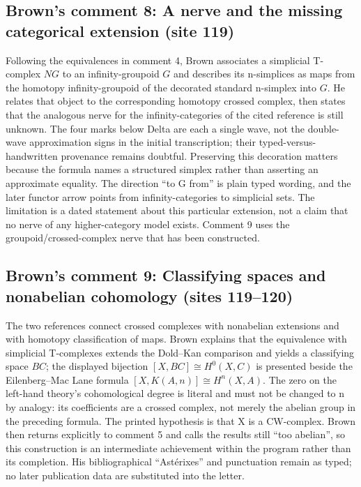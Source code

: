 \documentclass[10pt,oneside]{book}
\begin{document}
\subsection*{Brown's comment 8: A nerve and the missing categorical extension (site 119)}
Following the equivalences in comment 4, Brown associates a simplicial T-complex $NG$ to an infinity-groupoid $G$ and describes its n-simplices as maps from the homotopy infinity-groupoid of the decorated standard n-simplex into $G$. He relates that object to the corresponding homotopy crossed complex, then states that the analogous nerve for the infinity-categories of the cited reference is still unknown. The four marks below Delta are each a single wave, not the double-wave approximation signs in the initial transcription; their typed-versus-handwritten provenance remains doubtful. Preserving this decoration matters because the formula names a structured simplex rather than asserting an approximate equality. The direction ``to G from'' is plain typed wording, and the later functor arrow points from infinity-categories to simplicial sets. The limitation is a dated statement about this particular extension, not a claim that no nerve of any higher-category model exists. Comment 9 uses the groupoid/crossed-complex nerve that has been constructed.

\subsection*{Brown's comment 9: Classifying spaces and nonabelian cohomology (sites 119--120)}
The two references connect crossed complexes with nonabelian extensions and with homotopy classification of maps. Brown explains that the equivalence with simplicial T-complexes extends the Dold--Kan comparison and yields a classifying space $BC$; the displayed bijection $[X,BC]\cong H^0(X,C)$ is presented beside the Eilenberg--Mac Lane formula $[X,K(A,n)]\cong H^n(X,A)$. The zero on the left-hand theory's cohomological degree is literal and must not be changed to n by analogy: its coefficients are a crossed complex, not merely the abelian group in the preceding formula. The printed hypothesis is that X is a CW-complex. Brown then returns explicitly to comment 5 and calls the results still ``too abelian'', so this construction is an intermediate achievement within the program rather than its completion. His bibliographical ``Astérixes'' and punctuation remain as typed; no later publication data are substituted into the letter.
\end{document}
